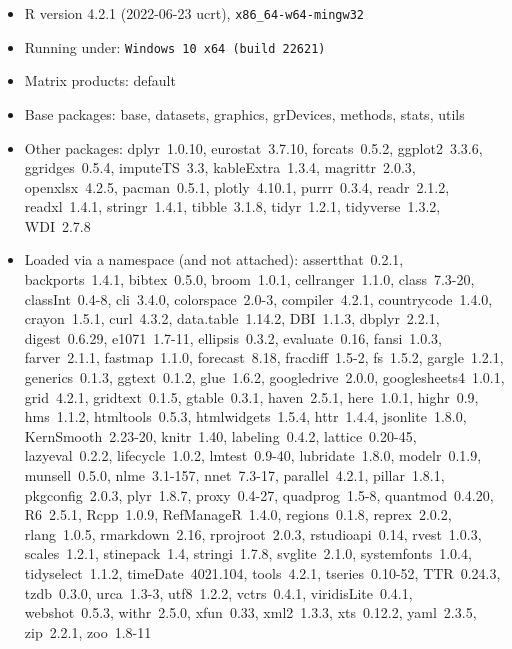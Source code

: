 \documentclass[
  12pt,
]{article}
\numberwithin{equation}{section}
\numberwithin{table}{section}
\numberwithin{figure}{section}
\begin{document}
\begin{itemize}\raggedright
  \item R version 4.2.1 (2022-06-23 ucrt), \verb|x86_64-w64-mingw32|
  \item Running under: \verb|Windows 10 x64 (build 22621)|
  \item Matrix products: default
  \item Base packages: base, datasets, graphics, grDevices, methods,
    stats, utils
  \item Other packages: dplyr~1.0.10, eurostat~3.7.10, forcats~0.5.2,
    ggplot2~3.3.6, ggridges~0.5.4, imputeTS~3.3, kableExtra~1.3.4,
    magrittr~2.0.3, openxlsx~4.2.5, pacman~0.5.1, plotly~4.10.1,
    purrr~0.3.4, readr~2.1.2, readxl~1.4.1, stringr~1.4.1,
    tibble~3.1.8, tidyr~1.2.1, tidyverse~1.3.2, WDI~2.7.8
  \item Loaded via a namespace (and not attached): assertthat~0.2.1,
    backports~1.4.1, bibtex~0.5.0, broom~1.0.1, cellranger~1.1.0,
    class~7.3-20, classInt~0.4-8, cli~3.4.0, colorspace~2.0-3,
    compiler~4.2.1, countrycode~1.4.0, crayon~1.5.1, curl~4.3.2,
    data.table~1.14.2, DBI~1.1.3, dbplyr~2.2.1, digest~0.6.29,
    e1071~1.7-11, ellipsis~0.3.2, evaluate~0.16, fansi~1.0.3,
    farver~2.1.1, fastmap~1.1.0, forecast~8.18, fracdiff~1.5-2,
    fs~1.5.2, gargle~1.2.1, generics~0.1.3, ggtext~0.1.2, glue~1.6.2,
    googledrive~2.0.0, googlesheets4~1.0.1, grid~4.2.1, gridtext~0.1.5,
    gtable~0.3.1, haven~2.5.1, here~1.0.1, highr~0.9, hms~1.1.2,
    htmltools~0.5.3, htmlwidgets~1.5.4, httr~1.4.4, jsonlite~1.8.0,
    KernSmooth~2.23-20, knitr~1.40, labeling~0.4.2, lattice~0.20-45,
    lazyeval~0.2.2, lifecycle~1.0.2, lmtest~0.9-40, lubridate~1.8.0,
    modelr~0.1.9, munsell~0.5.0, nlme~3.1-157, nnet~7.3-17,
    parallel~4.2.1, pillar~1.8.1, pkgconfig~2.0.3, plyr~1.8.7,
    proxy~0.4-27, quadprog~1.5-8, quantmod~0.4.20, R6~2.5.1,
    Rcpp~1.0.9, RefManageR~1.4.0, regions~0.1.8, reprex~2.0.2,
    rlang~1.0.5, rmarkdown~2.16, rprojroot~2.0.3, rstudioapi~0.14,
    rvest~1.0.3, scales~1.2.1, stinepack~1.4, stringi~1.7.8,
    svglite~2.1.0, systemfonts~1.0.4, tidyselect~1.1.2,
    timeDate~4021.104, tools~4.2.1, tseries~0.10-52, TTR~0.24.3,
    tzdb~0.3.0, urca~1.3-3, utf8~1.2.2, vctrs~0.4.1, viridisLite~0.4.1,
    webshot~0.5.3, withr~2.5.0, xfun~0.33, xml2~1.3.3, xts~0.12.2,
    yaml~2.3.5, zip~2.2.1, zoo~1.8-11
\end{itemize}

\normalsize
\singlespacing
\listoffigures
\listoftables

\def\bibpreamble{All online resources were last accessed on 12 December 2022.}
\footnotesize

  
\end{document}
